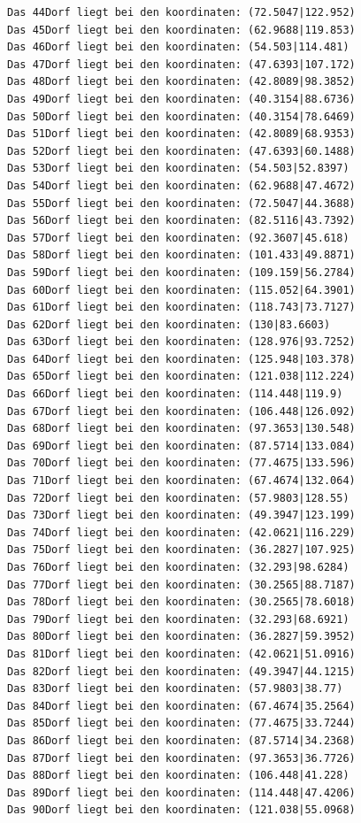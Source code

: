 \documentclass{article}
\begin{document}
\begin{verbatim}
Das 44Dorf liegt bei den koordinaten: (72.5047|122.952)
Das 45Dorf liegt bei den koordinaten: (62.9688|119.853)
Das 46Dorf liegt bei den koordinaten: (54.503|114.481)
Das 47Dorf liegt bei den koordinaten: (47.6393|107.172)
Das 48Dorf liegt bei den koordinaten: (42.8089|98.3852)
Das 49Dorf liegt bei den koordinaten: (40.3154|88.6736)
Das 50Dorf liegt bei den koordinaten: (40.3154|78.6469)
Das 51Dorf liegt bei den koordinaten: (42.8089|68.9353)
Das 52Dorf liegt bei den koordinaten: (47.6393|60.1488)
Das 53Dorf liegt bei den koordinaten: (54.503|52.8397)
Das 54Dorf liegt bei den koordinaten: (62.9688|47.4672)
Das 55Dorf liegt bei den koordinaten: (72.5047|44.3688)
Das 56Dorf liegt bei den koordinaten: (82.5116|43.7392)
Das 57Dorf liegt bei den koordinaten: (92.3607|45.618)
Das 58Dorf liegt bei den koordinaten: (101.433|49.8871)
Das 59Dorf liegt bei den koordinaten: (109.159|56.2784)
Das 60Dorf liegt bei den koordinaten: (115.052|64.3901)
Das 61Dorf liegt bei den koordinaten: (118.743|73.7127)
Das 62Dorf liegt bei den koordinaten: (130|83.6603)
Das 63Dorf liegt bei den koordinaten: (128.976|93.7252)
Das 64Dorf liegt bei den koordinaten: (125.948|103.378)
Das 65Dorf liegt bei den koordinaten: (121.038|112.224)
Das 66Dorf liegt bei den koordinaten: (114.448|119.9)
Das 67Dorf liegt bei den koordinaten: (106.448|126.092)
Das 68Dorf liegt bei den koordinaten: (97.3653|130.548)
Das 69Dorf liegt bei den koordinaten: (87.5714|133.084)
Das 70Dorf liegt bei den koordinaten: (77.4675|133.596)
Das 71Dorf liegt bei den koordinaten: (67.4674|132.064)
Das 72Dorf liegt bei den koordinaten: (57.9803|128.55)
Das 73Dorf liegt bei den koordinaten: (49.3947|123.199)
Das 74Dorf liegt bei den koordinaten: (42.0621|116.229)
Das 75Dorf liegt bei den koordinaten: (36.2827|107.925)
Das 76Dorf liegt bei den koordinaten: (32.293|98.6284)
Das 77Dorf liegt bei den koordinaten: (30.2565|88.7187)
Das 78Dorf liegt bei den koordinaten: (30.2565|78.6018)
Das 79Dorf liegt bei den koordinaten: (32.293|68.6921)
Das 80Dorf liegt bei den koordinaten: (36.2827|59.3952)
Das 81Dorf liegt bei den koordinaten: (42.0621|51.0916)
Das 82Dorf liegt bei den koordinaten: (49.3947|44.1215)
Das 83Dorf liegt bei den koordinaten: (57.9803|38.77)
Das 84Dorf liegt bei den koordinaten: (67.4674|35.2564)
Das 85Dorf liegt bei den koordinaten: (77.4675|33.7244)
Das 86Dorf liegt bei den koordinaten: (87.5714|34.2368)
Das 87Dorf liegt bei den koordinaten: (97.3653|36.7726)
Das 88Dorf liegt bei den koordinaten: (106.448|41.228)
Das 89Dorf liegt bei den koordinaten: (114.448|47.4206)
Das 90Dorf liegt bei den koordinaten: (121.038|55.0968)

\end{verbatim}
\end{document}
